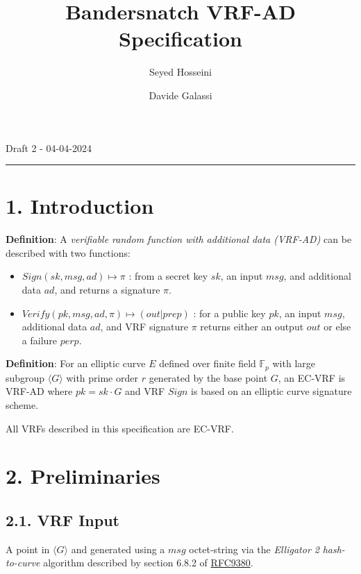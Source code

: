 \documentclass[
]{article}
\title{Bandersnatch VRF-AD Specification}
\author{Seyed Hosseini \and Davide Galassi}
\date{}
\providecommand{\tightlist}{%
  \setlength{\itemsep}{0pt}\setlength{\parskip}{0pt}}
\begin{document}
\maketitle

Draft 2 - 04-04-2024

\newcommand{\G}{\langle G \rangle}
\newcommand{\F}{\mathbb{Z}^*_r}

\begin{center}\rule{0.5\linewidth}{0.5pt}\end{center}

\hypertarget{introduction}{%
\section{1. Introduction}\label{introduction}}

\textbf{Definition}: A \emph{verifiable random function with additional
data (VRF-AD)} can be described with two functions:

\begin{itemize}
\tightlist
\item
  \(Sign(sk,msg,ad) \mapsto \pi\) : from a secret key \(sk\), an input
  \(msg\), and additional data \(ad\), and returns a signature \(\pi\).
\item
  \(Verify(pk,msg,ad,\pi) \mapsto (out|prep)\) : for a public key
  \(pk\), an input \(msg\), additional data \(ad\), and VRF signature
  \(\pi\) returns either an output \(out\) or else a failure \(perp\).
\end{itemize}

\textbf{Definition}: For an elliptic curve \(E\) defined over finite
field \(\mathbb{F}_p\) with large subgroup \(\langle G \rangle\) with
prime order \(r\) generated by the base point \(G\), an EC-VRF is VRF-AD
where \(pk = sk \cdot G\) and VRF \(Sign\) is based on an elliptic curve
signature scheme.

All VRFs described in this specification are EC-VRF.

\hypertarget{preliminaries}{%
\section{2. Preliminaries}\label{preliminaries}}

\hypertarget{vrf-input}{%
\subsection{2.1. VRF Input}\label{vrf-input}}

A point in \(\langle G \rangle\) and generated using a \(msg\)
octet-string via the \emph{Elligator 2} \emph{hash-to-curve} algorithm
described by section 6.8.2 of
\href{https://datatracker.ietf.org/doc/rfc9380/}{RFC9380}.
\end{document}
